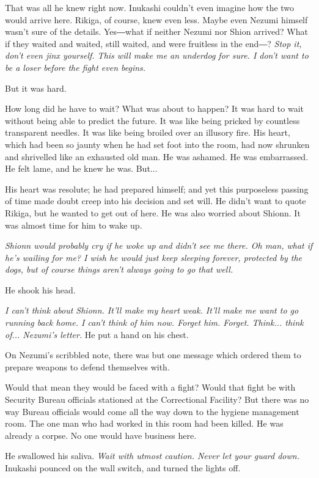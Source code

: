 That was all he knew right now. Inukashi couldn't even imagine how the
two would arrive here. Rikiga, of course, knew even less. Maybe even
Nezumi himself wasn't sure of the details. Yes―what if neither Nezumi
nor Shion arrived? What if they waited and waited, still waited, and
were fruitless in the end―? \emph{Stop it, don't even jinx yourself. This will
	make me an underdog for sure. I don't want to be a loser before the
	fight even begins.}

But it was hard.

How long did he have to wait? What was about to happen? It was hard to
wait without being able to predict the future. It was like being pricked
by countless transparent needles. It was like being broiled over an
illusory fire. His heart, which had been so jaunty when he had set foot
into the room, had now shrunken and shrivelled like an exhausted old
man. He was ashamed. He was embarrassed. He felt lame, and he knew he
was. But...

His heart was resolute; he had prepared himself; and yet this
purposeless passing of time made doubt creep into his decision and set
will. He didn't want to quote Rikiga, but he wanted to get out of here.
He was also worried about Shionn. It was almost time for him to wake up.

\emph{Shionn would probably cry if he woke up and didn't see me there. Oh man,
	what if he's wailing for me? I wish he would just keep sleeping forever,
	protected by the dogs, but of course things aren't always going to go
	that well.}

He shook his head.

\emph{I can't think about Shionn. It'll make my heart weak. It'll make me want
	to go running back home. I can't think of him now. Forget him. Forget.
	Think... think of... Nezumi's letter.} He put a hand on his chest.

On Nezumi's scribbled note, there was but one message which ordered them
to prepare weapons to defend themselves with.


Would that mean they would be faced with a fight? Would that fight be
with Security Bureau officials stationed at the Correctional Facility?
But there was no way Bureau officials would come all the way down to the
hygiene management room. The one man who had worked in this room had
been killed. He was already a corpse. No one would have business here.

He swallowed his saliva. \emph{Wait with utmost caution. Never let your guard
	down.} Inukashi pounced on the wall switch, and turned the lights off.

